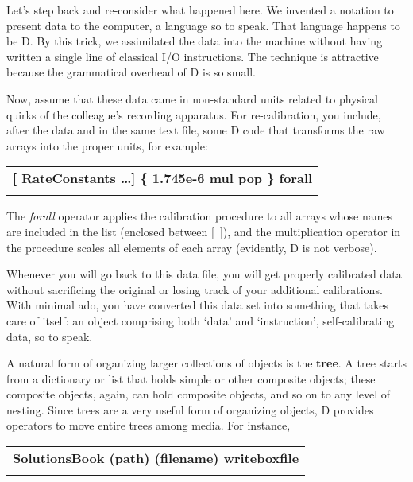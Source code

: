Let's  step  back  and re-consider what happened  here.  We  invented  a notation to present data to the computer,  a language so to  speak.  That language happens to be D. By this trick, we assimilated the data into the machine   without  having  written  a  single  line  of   classical   I/O instructions.   The  technique  is  attractive  because  the  grammatical overhead of D is so small. 

Now,  assume  that  these  data came in non-standard  units  related  to physical  quirks  of  the  colleague's  recording  apparatus.   For   re-calibration,  you include, after the data and in the same text file, some D  code  that  transforms  the raw arrays  into  the  proper  units,  for example:\\

\begin{tabular}{>{\sffamily\bfseries}l}
 [ RateConstants \ldots ] \{ 1.745e-6 mul pop \} forall\\\\
\end{tabular}

\noindent The  \emph{forall} operator applies the calibration procedure to  all  arrays whose  names  are included in the list (enclosed  between  [\ ]),  and  the multiplication  operator  in the procedure scales all  elements  of  each array (evidently, D is not verbose).

Whenever  you  will  go back to this data file,  you  will  get  properly calibrated  data  without  sacrificing the original or  losing  track  of your additional calibrations.  With minimal ado,  you have converted this data set into something that takes care of itself:  an object  comprising both `data' and `instruction', self-calibrating data, so to speak.

A natural form of organizing larger collections of objects is the \textbf{tree}. A  tree  starts  from a dictionary or list that  holds  simple  or  other composite objects;  these composite objects,  again,  can hold  composite objects, and so on to any level of nesting. Since trees are a very useful form  of organizing objects,  D provides operators to move  entire  trees among media. For instance,\\

\begin{tabular}{>{\sffamily\bfseries}l}
 SolutionsBook (path) (filename) writeboxfile\\\\
\end{tabular}

